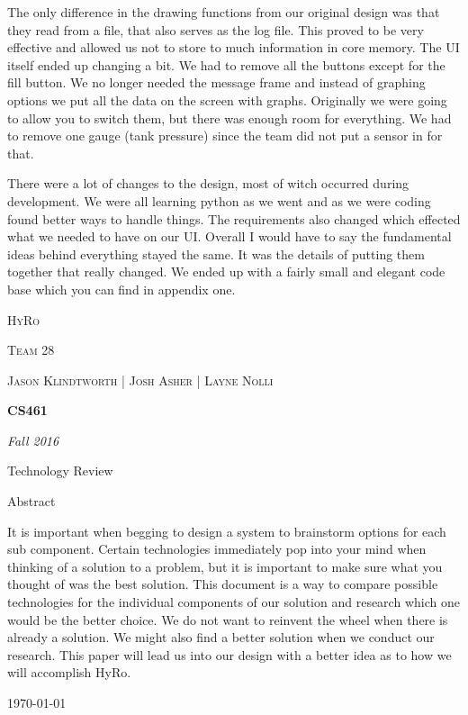 \documentclass[10pt,draftclsnofoot,onecolumn,retainorgcmds]{IEEEtran}
\begin{document}
The only difference in the drawing functions from our original design was that they read from a file, that also serves as the log file. This proved to be very effective and allowed us not to store to much information in core memory. The UI itself ended up changing a  bit. We had to remove all the buttons except for the fill button. We no longer needed the message frame and instead of graphing options we put all the data on the screen with graphs. Originally we were going to allow you to switch them, but there was enough room for everything. We had to remove one gauge (tank pressure) since the team did not put a sensor in for that. \par
There were a lot of changes to the design, most of witch occurred during development. We were all learning python as we went and as we were coding found better ways to handle things. The requirements also changed which effected what we needed to have on our UI. Overall I would have to say the fundamental ideas behind everything stayed the same. It was the details of putting them together that really changed. We ended up with a fairly small and elegant code base which you can find in appendix one. \par

\begin{titlepage}
	\centering
	{\scshape\LARGE HyRo \par}
	{\scshape\LARGE Team 28\par}
	\vspace{1cm}
	{\scshape\Large Jason Klindtworth  |  Josh Asher  |   Layne Nolli}
	\noindent\makebox[\linewidth]{\rule{17cm}{2pt}}
	\vspace{1cm}
	{\huge\bfseries CS461\par}
	\vspace{2cm}
	{\Large\itshape Fall 2016\par}
	\vspace{4cm}
	{\large Technology Review\par}
	\vspace{4cm}
	{\large Abstract\par}
	\vspace{1cm}
	It is important when begging to design a system to brainstorm options for each sub component. Certain technologies immediately pop into your mind when thinking of a solution to a problem, but it is important to make sure what you thought of was the best solution. This document is a way to compare possible technologies for the individual components of our solution and research which one would be the better choice. We do not want to reinvent the wheel when there is already a solution. We might also find a better solution when we conduct our research. This paper will lead us into our design with a better idea as to how we will accomplish HyRo.\\
	\noindent\makebox[\linewidth]{\rule{17cm}{2pt}}
	
	\vfill
	
	{\large \today\par}
\end{titlepage}
\tableofcontents
\end{document}
